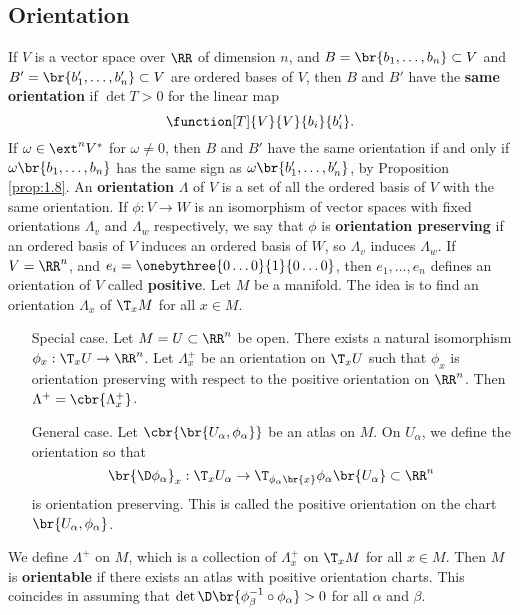 \pagebreak

\subsection{Orientation}

If $ V $ is a vector space over $ \RR $ of dimension $ n $, and $ B = \br{b_1, \dots, b_n} \subset V $ and $ B' = \br{b_1', \dots, b_n'} \subset V $ are ordered bases of $ V $, then $ B $ and $ B' $ have the \textbf{same orientation} if $ \det T > 0 $ for the linear map
$$ \function[T]{V}{V}{b_i}{b_i'}. $$
If $ \omega \in \ext^nV^* $ for $ \omega \ne 0 $, then $ B $ and $ B' $ have the same orientation if and only if $ \omega\br{b_1, \dots, b_n} $ has the same sign as $ \omega\br{b_1', \dots, b_n'} $, by Proposition \ref{prop:1.8}. An \textbf{orientation} $ \Lambda $ of $ V $ is a set of all the ordered basis of $ V $ with the same orientation. If $ \phi : V \to W $ is an isomorphism of vector spaces with fixed orientations $ \Lambda_v $ and $ \Lambda_w $ respectively, we say that $ \phi $ is \textbf{orientation preserving} if an ordered basis of $ V $ induces an ordered basis of $ W $, so $ \Lambda_v $ induces $ \Lambda_w $. If $ V = \RR^n $, and $ e_i = \onebythree{0 \dots 0}{1}{0 \dots 0} $, then $ e_1, \dots, e_n $ defines an orientation of $ V $ called \textbf{positive}. Let $ M $ be a manifold. The idea is to find an orientation $ \Lambda_x $ of $ \T_xM $ for all $ x \in M $.
\begin{itemize}[leftmargin=1in]
\item[Special case.] Let $ M = U \subset \RR^n $ be open. There exists a natural isomorphism $ \phi_x : \T_xU \to \RR^n $. Let $ \Lambda_x^+ $ be an orientation on $ \T_xU $ such that $ \phi_x $ is orientation preserving with respect to the positive orientation on $ \RR^n $. Then $ \Lambda^+ = \cbr{\Lambda_x^+} $.
\item[General case.] Let $ \cbr{\br{U_\alpha, \phi_\alpha}} $ be an atlas on $ M $. On $ U_\alpha $, we define the orientation so that
$$ \br{\D\phi_\alpha}_x : \T_xU_\alpha \to \T_{\phi_\alpha\br{x}}\phi_\alpha\br{U_\alpha} \subset \RR^n $$
is orientation preserving. This is called the positive orientation on the chart $ \br{U_\alpha, \phi_\alpha} $.
\end{itemize}
We define $ \Lambda^+ $ on $ M $, which is a collection of $ \Lambda_x^+ $ on $ \T_xM $ for all $ x \in M $. Then $ M $ is \textbf{orientable} if there exists an atlas with positive orientation charts. This coincides in assuming that $ \det \D\br{\phi_\beta^{-1} \circ \phi_\alpha} > 0 $ for all $ \alpha $ and $ \beta $.

